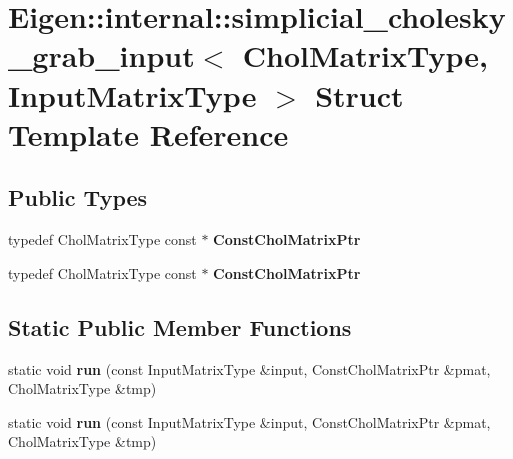 \hypertarget{struct_eigen_1_1internal_1_1simplicial__cholesky__grab__input}{}\section{Eigen\+:\+:internal\+:\+:simplicial\+\_\+cholesky\+\_\+grab\+\_\+input$<$ Chol\+Matrix\+Type, Input\+Matrix\+Type $>$ Struct Template Reference}
\label{struct_eigen_1_1internal_1_1simplicial__cholesky__grab__input}
\subsection*{Public Types}
\begin{DoxyCompactItemize}
\item 
\mbox{\label{struct_eigen_1_1internal_1_1simplicial__cholesky__grab__input_aa40b82ddba001795c47760775a5ed4a5}} 
typedef Chol\+Matrix\+Type const  $\ast$ {\bfseries Const\+Chol\+Matrix\+Ptr}
\item 
\mbox{\label{struct_eigen_1_1internal_1_1simplicial__cholesky__grab__input_aa40b82ddba001795c47760775a5ed4a5}} 
typedef Chol\+Matrix\+Type const  $\ast$ {\bfseries Const\+Chol\+Matrix\+Ptr}
\end{DoxyCompactItemize}
\subsection*{Static Public Member Functions}
\begin{DoxyCompactItemize}
\item 
\mbox{\label{struct_eigen_1_1internal_1_1simplicial__cholesky__grab__input_ad2473ac42c6e41b5eb5383be03740c05}} 
static void {\bfseries run} (const Input\+Matrix\+Type \&input, Const\+Chol\+Matrix\+Ptr \&pmat, Chol\+Matrix\+Type \&tmp)
\item 
\mbox{\label{struct_eigen_1_1internal_1_1simplicial__cholesky__grab__input_ad2473ac42c6e41b5eb5383be03740c05}} 
static void {\bfseries run} (const Input\+Matrix\+Type \&input, Const\+Chol\+Matrix\+Ptr \&pmat, Chol\+Matrix\+Type \&tmp)
\end{DoxyCompactItemize}


